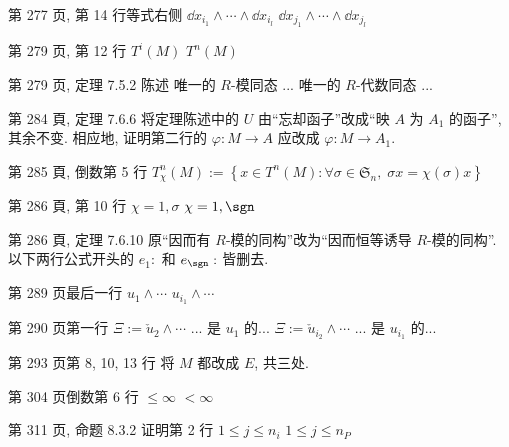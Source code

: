 \documentclass{AJerrata}
\begin{document}
\begin{Errata}
        \item[第 277 页, 第 14 行等式右侧]
        \Orig $\dd x_{i_1} \wedge \cdots \wedge \dd x_{i_l}$
        \Corr $\dd x_{j_1} \wedge \cdots \wedge \dd x_{j_l}$
        
        \item[第 279 页, 第 12 行]
        \Orig $T^i(M)$
        \Corr $T^n(M)$
        
        \item[第 279 页, 定理 7.5.2 陈述]
        \Orig 唯一的 $R$-模同态 ...
        \Corr 唯一的 $R$-代数同态 ...
        
		\item[第 284 頁, 定理 7.6.6]
		将定理陈述中的 $U$ 由``忘却函子''改成``映 $A$ 为 $A_1$ 的函子'', 其余不变. 相应地, 证明第二行的 $\varphi: M \to A$ 应改成 $\varphi: M \to A_1$.
		
		\item[第 285 頁, 倒数第 5 行]
		$T_\chi^n(M) := \left\{ x \in T^n(M) : \forall \sigma \in \mathfrak{S}_n, \; \sigma x = \chi(\sigma) x \right\}$

		\item[第 286 頁, 第 10 行]
		\Orig $\chi = 1, \sigma$
		\Corr $\chi = 1, \sgn$
		
		\item[第 286 頁, 定理 7.6.10]
		原``因而有 $R$-模的同构''改为``因而恒等诱导 $R$-模的同构''. 以下两行公式开头的 $e_1:$ 和 $e_{\sgn}: $ 皆删去.
		
		\item[第 289 页最后一行]
		\Orig $u_1 \wedge \cdots$
		\Corr $u_{i_1} \wedge \cdots$
		
		\item[第 290 页第一行]
		\Orig $\Xi := \check{u}_2 \wedge \cdots$ ... 是 $u_1$ 的...
		\Corr $\Xi := \check{u}_{i_2} \wedge \cdots$ ... 是 $u_{i_1}$ 的...
		
		\item[第 293 页第 8, 10, 13 行]
		将 $M$ 都改成 $E$, 共三处.
		
		\item[第 304 页倒数第 6 行]
		\Orig $\leq \infty$
		\Corr $< \infty$
        
        \item[第 311 页, 命题 8.3.2 证明第 2 行]
        \Orig $1 \leq j \leq n_i$
        \Corr $1 \leq j \leq n_P$
        

\end{Errata}
\end{document}
